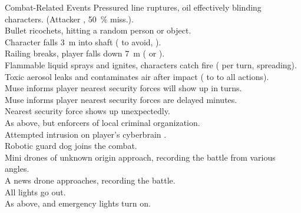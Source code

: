 \begin{tableone}{Combat-Related Events}
Pressured line ruptures, oil effectively blinding characters. (Attacker , \SI{50}{\percent} miss.).\\
Bullet ricochets, hitting a random person or object.\\
Character falls \SI{3}{\m} into shaft ( to avoid,  ). \\
Railing breaks, player falls down \SI{7}{\m} ( or  ). \\
Flammable liquid sprays and ignites, characters catch fire ( per turn, spreading). \\
Toxic aerosol leaks and contaminates air after impact ( to  to all actions). \\
Muse informs player nearest security forces will show up in  turns.\\
Muse informs player nearest security forces are delayed  minutes.\\
Nearest security force shows up unexpectedly.\\
As above, but enforcers of local criminal organization.\\
Attempted intrusion on player's cyberbrain .\\
Robotic guard dog joins the combat.\\
Mini drones of unknown origin approach, recording the battle from various angles.\\
A news drone approaches, recording the battle.\\
All lights go out.\\
As above, and emergency lights turn on.\\
\end{tableone}

